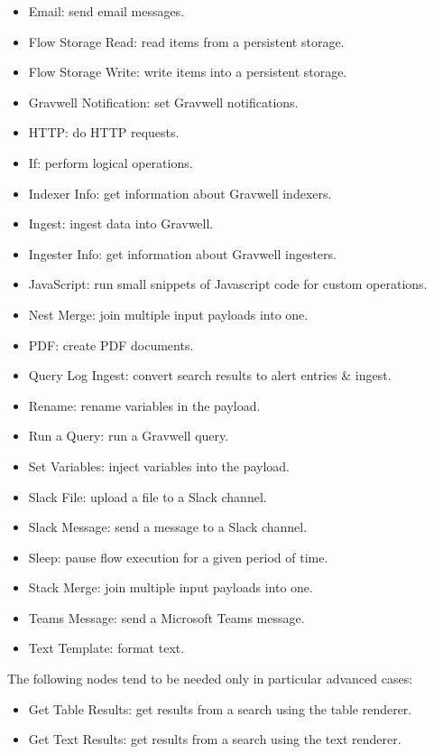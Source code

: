 \begin{itemize}
\item Email: send email messages.
\item Flow Storage Read: read items from a persistent storage.
\item Flow Storage Write: write items into a persistent storage.
\item Gravwell Notification: set Gravwell notifications.
\item HTTP: do HTTP requests.
\item If: perform logical operations.
\item Indexer Info: get information about Gravwell indexers.
\item Ingest: ingest data into Gravwell.
\item Ingester Info: get information about Gravwell ingesters.
\item JavaScript: run small snippets of Javascript code for custom operations.
\item Nest Merge: join multiple input payloads into one.
\item PDF: create PDF documents.
\item Query Log Ingest: convert search results to alert entries \& ingest.
\item Rename: rename variables in the payload.
\item Run a Query: run a Gravwell query.
\item Set Variables: inject variables into the payload.
\item Slack File: upload a file to a Slack channel.
\item Slack Message: send a message to a Slack channel.
\item Sleep: pause flow execution for a given period of time.
\item Stack Merge: join multiple input payloads into one.
\item Teams Message: send a Microsoft Teams message.
\item Text Template: format text.
\end{itemize}

The following nodes tend to be needed only in particular advanced cases:

\begin{itemize}
\item Get Table Results: get results from a search using the table renderer.
\item Get Text Results: get results from a search using the text renderer.
\end{itemize}

